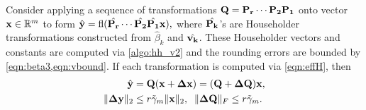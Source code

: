 \begin{lemma}\label{lem:19.3}
	Consider applying a sequence of transformations $\mathbf{Q}=\mathbf{P_r}\cdots\mathbf{P_2P_1}$ onto vector $\mathbf{x}\in\mathbb{R}^m$ to form $\hat{\mathbf{y}} =\mathrm{fl}(\hat{\mathbf{P_r}}\cdots\hat{\mathbf{P_2}}\hat{\mathbf{P_1}}\mathbf{x}),$
	where $\hat{\mathbf{P_k}}$'s are Householder transformations constructed from $\hat{\beta}_k$ and $\hat{\mathbf{v_k}}$.
	These Householder vectors and constants are computed via \cref{algo:hh_v2} and the rounding errors are bounded by \cref{eqn:beta3,eqn:vbound}.
	If each transformation is computed via \cref{eqn:effH}, then
	\begin{align}
	\hat{\bb{y}} &= \bb{Q} (\bb{x} +\bb{\Delta x}) = (\bb{Q} + \bb{\Delta Q})\bb{x},\\
	\|\bb{\Delta y}\|_2 &\leq r\tilde{\gamma}_m\|\bb{x}\|_2,\;\; \|\bb{\Delta Q}\|_F\leq r\tilde{\gamma}_m .\label{eqn:19.3}
	\end{align}
\end{lemma}
